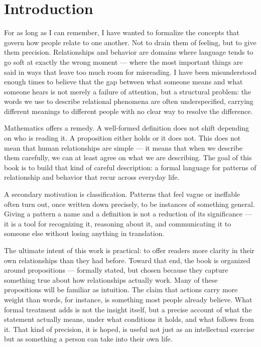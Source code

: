 \chapter{Introduction}

For as long as I can remember, I have wanted to formalize the concepts that govern how people relate to one another.
Not to drain them of feeling, but to give them precision.
Relationships and behavior are domains where language tends to go soft at exactly the wrong moment --- where the most important things are said in ways that leave too much room for misreading.
I have been misunderstood enough times to believe that the gap between what someone means and what someone hears is not merely a failure of attention, but a structural problem: the words we use to describe relational phenomena are often underspecified, carrying different meanings to different people with no clear way to resolve the difference.

Mathematics offers a remedy.
A well-formed definition does not shift depending on who is reading it.
A proposition either holds or it does not.
This does not mean that human relationships are simple --- it means that when we describe them carefully, we can at least agree on what we are describing.
The goal of this book is to build that kind of careful description: a formal language for patterns of relationship and behavior that recur across everyday life.

A secondary motivation is classification.
Patterns that feel vague or ineffable often turn out, once written down precisely, to be instances of something general.
Giving a pattern a name and a definition is not a reduction of its significance --- it is a tool for recognizing it, reasoning about it, and communicating it to someone else without losing anything in translation.

The ultimate intent of this work is practical: to offer readers more clarity in their own relationships than they had before.
Toward that end, the book is organized around propositions --- formally stated, but chosen because they capture something true about how relationships actually work.
Many of these propositions will be familiar as intuition.
The claim that actions carry more weight than words, for instance, is something most people already believe.
What formal treatment adds is not the insight itself, but a precise account of what the statement actually means, under what conditions it holds, and what follows from it.
That kind of precision, it is hoped, is useful not just as an intellectual exercise but as something a person can take into their own life.
